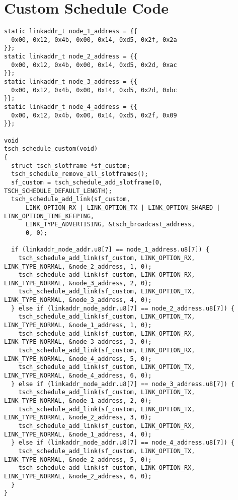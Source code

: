 \section{Custom Schedule Code\label{code:customsched}}

\begin{lstlisting}
static linkaddr_t node_1_address = {{ 
  0x00, 0x12, 0x4b, 0x00, 0x14, 0xd5, 0x2f, 0x2a 
}};
static linkaddr_t node_2_address = {{
  0x00, 0x12, 0x4b, 0x00, 0x14, 0xd5, 0x2d, 0xac
}};
static linkaddr_t node_3_address = {{
  0x00, 0x12, 0x4b, 0x00, 0x14, 0xd5, 0x2d, 0xbc
}};
static linkaddr_t node_4_address = {{
  0x00, 0x12, 0x4b, 0x00, 0x14, 0xd5, 0x2f, 0x09
}};

void
tsch_schedule_custom(void)
{
  struct tsch_slotframe *sf_custom;
  tsch_schedule_remove_all_slotframes();
  sf_custom = tsch_schedule_add_slotframe(0, TSCH_SCHEDULE_DEFAULT_LENGTH);
  tsch_schedule_add_link(sf_custom,
      LINK_OPTION_RX | LINK_OPTION_TX | LINK_OPTION_SHARED | LINK_OPTION_TIME_KEEPING,
      LINK_TYPE_ADVERTISING, &tsch_broadcast_address,
      0, 0);

  if (linkaddr_node_addr.u8[7] == node_1_address.u8[7]) {
    tsch_schedule_add_link(sf_custom, LINK_OPTION_RX, LINK_TYPE_NORMAL, &node_2_address, 1, 0);
    tsch_schedule_add_link(sf_custom, LINK_OPTION_RX, LINK_TYPE_NORMAL, &node_3_address, 2, 0);
    tsch_schedule_add_link(sf_custom, LINK_OPTION_TX, LINK_TYPE_NORMAL, &node_3_address, 4, 0);
  } else if (linkaddr_node_addr.u8[7] == node_2_address.u8[7]) {
    tsch_schedule_add_link(sf_custom, LINK_OPTION_TX, LINK_TYPE_NORMAL, &node_1_address, 1, 0);
    tsch_schedule_add_link(sf_custom, LINK_OPTION_RX, LINK_TYPE_NORMAL, &node_3_address, 3, 0);
    tsch_schedule_add_link(sf_custom, LINK_OPTION_RX, LINK_TYPE_NORMAL, &node_4_address, 5, 0);
    tsch_schedule_add_link(sf_custom, LINK_OPTION_TX, LINK_TYPE_NORMAL, &node_4_address, 6, 0);
  } else if (linkaddr_node_addr.u8[7] == node_3_address.u8[7]) {
    tsch_schedule_add_link(sf_custom, LINK_OPTION_TX, LINK_TYPE_NORMAL, &node_1_address, 2, 0);
    tsch_schedule_add_link(sf_custom, LINK_OPTION_TX, LINK_TYPE_NORMAL, &node_2_address, 3, 0);
    tsch_schedule_add_link(sf_custom, LINK_OPTION_RX, LINK_TYPE_NORMAL, &node_1_address, 4, 0);
  } else if (linkaddr_node_addr.u8[7] == node_4_address.u8[7]) {
    tsch_schedule_add_link(sf_custom, LINK_OPTION_TX, LINK_TYPE_NORMAL, &node_2_address, 5, 0);
    tsch_schedule_add_link(sf_custom, LINK_OPTION_RX, LINK_TYPE_NORMAL, &node_2_address, 6, 0);
  }
}
\end{lstlisting}


